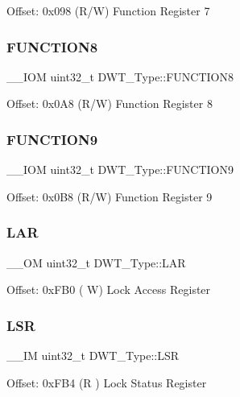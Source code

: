 Offset\+: 0x098 (R/W) Function Register 7 \mbox{\label{struct_d_w_t___type_acdd6b87ea4bc95345687074c53098e75}} 
\subsubsection{\texorpdfstring{FUNCTION8}{FUNCTION8}}
{\footnotesize\ttfamily \+\_\+\+\_\+\+I\+OM uint32\+\_\+t D\+W\+T\+\_\+\+Type\+::\+F\+U\+N\+C\+T\+I\+O\+N8}

Offset\+: 0x0\+A8 (R/W) Function Register 8 \mbox{\label{struct_d_w_t___type_a379b5b8f7d40003b7bdabd535e0378a1}} 
\subsubsection{\texorpdfstring{FUNCTION9}{FUNCTION9}}
{\footnotesize\ttfamily \+\_\+\+\_\+\+I\+OM uint32\+\_\+t D\+W\+T\+\_\+\+Type\+::\+F\+U\+N\+C\+T\+I\+O\+N9}

Offset\+: 0x0\+B8 (R/W) Function Register 9 \mbox{\label{struct_d_w_t___type_a4b8037802a3b25e367f0977d86f754ad}} 
\subsubsection{\texorpdfstring{LAR}{LAR}}
{\footnotesize\ttfamily \+\_\+\+\_\+\+OM uint32\+\_\+t D\+W\+T\+\_\+\+Type\+::\+L\+AR}

Offset\+: 0x\+F\+B0 ( W) Lock Access Register \mbox{\label{struct_d_w_t___type_a4281befcc19ee69afdd50801cb1c9bcf}} 
\subsubsection{\texorpdfstring{LSR}{LSR}}
{\footnotesize\ttfamily \+\_\+\+\_\+\+IM uint32\+\_\+t D\+W\+T\+\_\+\+Type\+::\+L\+SR}

Offset\+: 0x\+F\+B4 (R ) Lock Status Register \mbox{\label{struct_d_w_t___type_acc05d89bdb1b4fe2fa499920ec02d0b1}} 
